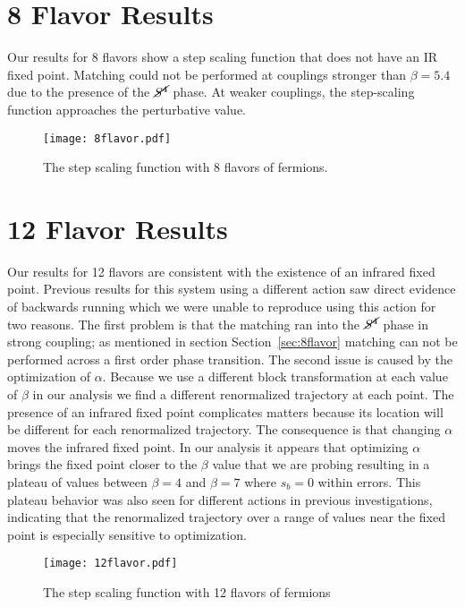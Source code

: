 \documentclass{PoS}
\newcommand{\Sb}{\ensuremath{\cancel{S^4}} }
\newcommand{\secref}[1]{Section~\ref{#1}}
\begin{document}
\section{\label{sec:8flavor}8 Flavor Results}
Our results for 8 flavors show a step scaling function that does not have an IR fixed point.
Matching could not be performed at couplings stronger than $\beta = 5.4$ due to the presence of the \Sb phase.
At weaker couplings, the step-scaling function approaches the perturbative value.

\begin{figure}[htpb]
  \centering
  \texttt{[image: 8flavor.pdf]}
  \caption{The step scaling function with 8 flavors of fermions.}
  \label{fig:8flavor}
\end{figure}

\section{12 Flavor Results}
Our results for 12 flavors are consistent with the existence of an infrared fixed point.
Previous results for this system using a different action saw direct evidence of backwards running which we were unable to reproduce using this action for two reasons.
The first problem is that the matching ran into the \Sb phase in strong coupling; as mentioned in section \secref{sec:8flavor} matching can not be performed across a first order phase transition. 
The second issue is caused by the optimization of $\alpha$.
Because we use a different block transformation at each value of $\beta$ in our analysis we find a different renormalized trajectory at each point.
The presence of an infrared fixed point complicates matters because its location will be different for each renormalized trajectory.
The consequence is that changing $\alpha$ moves the infrared fixed point.
In our analysis it appears that optimizing $\alpha$ brings the fixed point closer to the $\beta$ value that we are probing resulting in a plateau of values between $\beta=4$ and $\beta=7$ where $s_b=0$ within errors.
This plateau behavior was also seen for different actions in previous investigations, indicating that the renormalized trajectory over a range of values near the fixed point is especially sensitive to optimization.

\begin{figure}[htpb]
  \centering
  \texttt{[image: 12flavor.pdf]}
  \caption{The step scaling function with 12 flavors of fermions}
  \label{fig:12flavor}
\end{figure}
\end{document}
